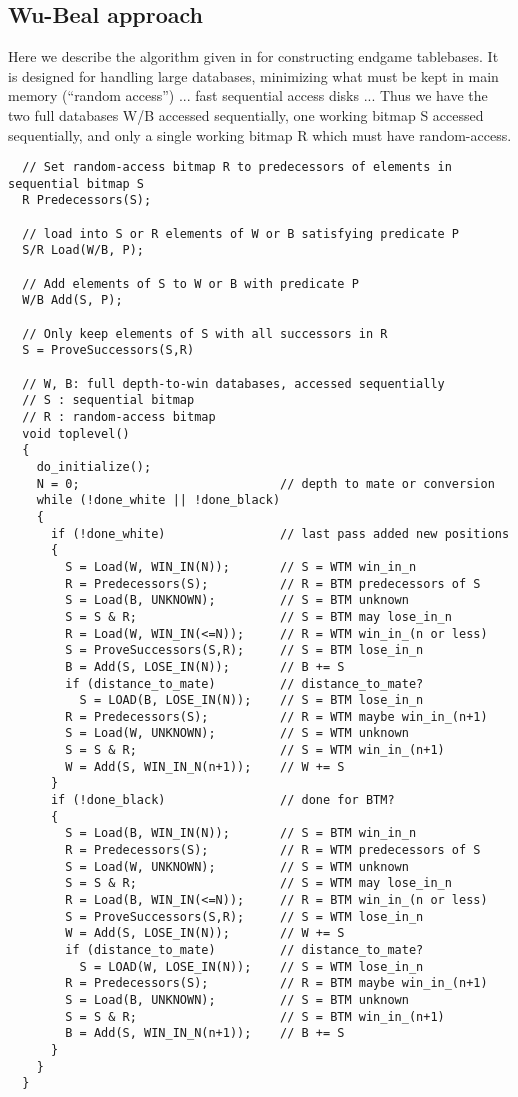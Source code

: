 \documentclass[10pt,dvipdfmx,letterpaper]{report}
\begin{document}
\subsection{Wu-Beal approach}
Here we describe the algorithm given in \cite{wu-beal} for constructing endgame tablebases.
It is designed for handling large databases, minimizing what must be kept in main memory
(``random access'') ... fast sequential access disks ...
Thus we have the two full databases W/B accessed sequentially,
one working bitmap S accessed sequentially,
and only a single working bitmap R which must have random-access.
\begin{verbatim}
  // Set random-access bitmap R to predecessors of elements in sequential bitmap S
  R Predecessors(S);

  // load into S or R elements of W or B satisfying predicate P
  S/R Load(W/B, P);

  // Add elements of S to W or B with predicate P
  W/B Add(S, P);

  // Only keep elements of S with all successors in R
  S = ProveSuccessors(S,R)

  // W, B: full depth-to-win databases, accessed sequentially
  // S : sequential bitmap
  // R : random-access bitmap
  void toplevel()
  {
    do_initialize();
    N = 0;                            // depth to mate or conversion
    while (!done_white || !done_black)
    {
      if (!done_white)                // last pass added new positions
      {
        S = Load(W, WIN_IN(N));       // S = WTM win_in_n
        R = Predecessors(S);          // R = BTM predecessors of S
        S = Load(B, UNKNOWN);         // S = BTM unknown
        S = S & R;                    // S = BTM may lose_in_n
        R = Load(W, WIN_IN(<=N));     // R = WTM win_in_(n or less)
        S = ProveSuccessors(S,R);     // S = BTM lose_in_n
        B = Add(S, LOSE_IN(N));       // B += S
        if (distance_to_mate)         // distance_to_mate?
          S = LOAD(B, LOSE_IN(N));    // S = BTM lose_in_n
        R = Predecessors(S);          // R = WTM maybe win_in_(n+1)
        S = Load(W, UNKNOWN);         // S = WTM unknown
        S = S & R;                    // S = WTM win_in_(n+1)
        W = Add(S, WIN_IN_N(n+1));    // W += S
      }
      if (!done_black)                // done for BTM?
      {
        S = Load(B, WIN_IN(N));       // S = BTM win_in_n
        R = Predecessors(S);          // R = WTM predecessors of S
        S = Load(W, UNKNOWN);         // S = WTM unknown
        S = S & R;                    // S = WTM may lose_in_n
        R = Load(B, WIN_IN(<=N));     // R = BTM win_in_(n or less)
        S = ProveSuccessors(S,R);     // S = WTM lose_in_n
        W = Add(S, LOSE_IN(N));       // W += S
        if (distance_to_mate)         // distance_to_mate?
          S = LOAD(W, LOSE_IN(N));    // S = WTM lose_in_n
        R = Predecessors(S);          // R = BTM maybe win_in_(n+1)
        S = Load(B, UNKNOWN);         // S = BTM unknown
        S = S & R;                    // S = BTM win_in_(n+1)
        B = Add(S, WIN_IN_N(n+1));    // B += S
      }
    }
  }
\end{verbatim}
\end{document}
